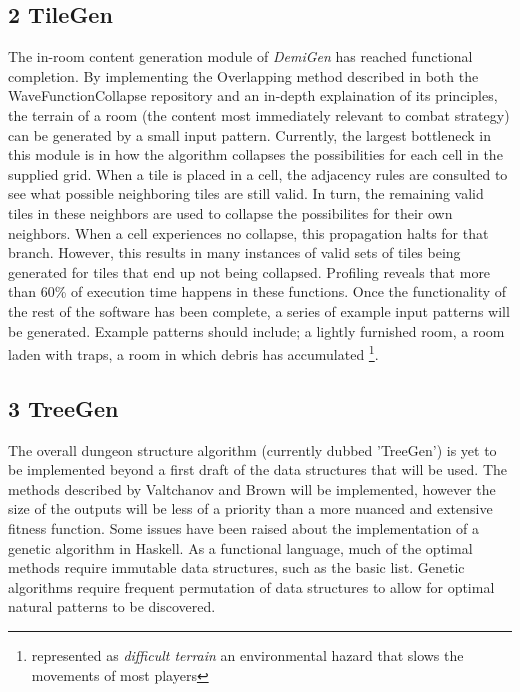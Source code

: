 \documentclass{article}
\begin{document}
\subsection{2 TileGen}
The in-room content generation module of \textit{DemiGen} has reached functional completion. By implementing the Overlapping method described in both the WaveFunctionCollapse\cite{wfc-report} repository and an in-depth explaination of its principles\cite{wfc-article}, the terrain of a room (the content most immediately relevant to combat strategy) can be generated by a small input pattern.
\linebreak
Currently, the largest bottleneck in this module is in how the algorithm collapses the possibilities for each cell in the supplied grid. When a tile is placed in a cell, the adjacency rules are consulted to see what possible neighboring tiles are still valid. In turn, the remaining valid tiles in these neighbors are used to collapse the possibilites for their own neighbors. When a cell experiences no collapse, this propagation halts for that branch. However, this results in many instances of valid sets of tiles being generated for tiles that end up not being collapsed. Profiling reveals that more than 60\% of execution time happens in these functions. 
\linebreak
Once the functionality of the rest of the software has been complete, a series of example input patterns will be generated. Example patterns should include; a lightly furnished room, a room laden with traps, a room in which debris has accumulated \footnote{represented as \textit{difficult terrain} an environmental hazard that slows the movements of most players}. 

\subsection{3 TreeGen}
The overall dungeon structure algorithm (currently dubbed 'TreeGen') is yet to be implemented beyond a first draft of the data structures that will be used. The methods described by Valtchanov and Brown\cite{genetic} will be implemented, however the size of the outputs will be less of a priority than a more nuanced and extensive fitness function. Some issues have been raised about the implementation of a genetic algorithm in Haskell. As a functional language, much of the optimal methods require immutable data structures, such as the basic list. Genetic algorithms require frequent permutation of data structures to allow for optimal natural patterns to be discovered. 
\end{document}
